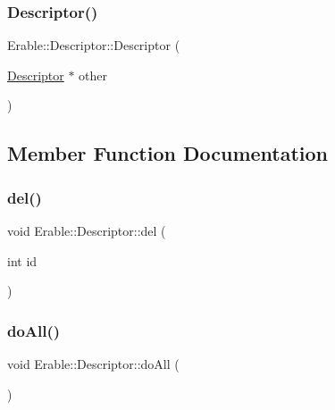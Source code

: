 \mbox{\label{class_erable_1_1_descriptor_a189b746040601d4c605d7d9a778223d2}} 
\subsubsection{\texorpdfstring{Descriptor()}{Descriptor()}\hspace{0.1cm}{\footnotesize\ttfamily [4/4]}}
{\footnotesize\ttfamily Erable\+::\+Descriptor\+::\+Descriptor (\begin{DoxyParamCaption}\item[{\mbox{\hyperlink{class_erable_1_1_descriptor}{Descriptor}} $\ast$}]{other }\end{DoxyParamCaption})\hspace{0.3cm}{\ttfamily [inline]}}



\subsection{Member Function Documentation}
\mbox{\label{class_erable_1_1_descriptor_af9b36335f8dcb7b14c80fcd955fc94bc}} 
\subsubsection{\texorpdfstring{del()}{del()}}
{\footnotesize\ttfamily void Erable\+::\+Descriptor\+::del (\begin{DoxyParamCaption}\item[{int}]{id }\end{DoxyParamCaption})}

\mbox{\label{class_erable_1_1_descriptor_a4e8aa3a2456928b76d8969286e96a270}} 
\subsubsection{\texorpdfstring{doAll()}{doAll()}}
{\footnotesize\ttfamily void Erable\+::\+Descriptor\+::do\+All (\begin{DoxyParamCaption}{ }\end{DoxyParamCaption})}

